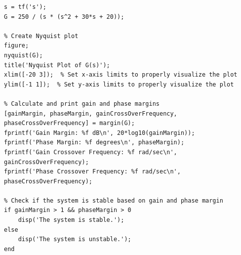 \documentclass[11pt]{article}
\begin{document}
\begin{lstlisting}[caption={MATLAB Code to Plot Nyquist of \( G(s) \)}]
% Define the transfer function
s = tf('s');
G = 250 / (s * (s^2 + 30*s + 20));

% Create Nyquist plot
figure;
nyquist(G);
title('Nyquist Plot of G(s)');
xlim([-20 3]);  % Set x-axis limits to properly visualize the plot
ylim([-1 1]);  % Set y-axis limits to properly visualize the plot

% Calculate and print gain and phase margins
[gainMargin, phaseMargin, gainCrossOverFrequency, phaseCrossOverFrequency] = margin(G);
fprintf('Gain Margin: %f dB\n', 20*log10(gainMargin));
fprintf('Phase Margin: %f degrees\n', phaseMargin);
fprintf('Gain Crossover Frequency: %f rad/sec\n', gainCrossOverFrequency);
fprintf('Phase Crossover Frequency: %f rad/sec\n', phaseCrossOverFrequency);

% Check if the system is stable based on gain and phase margin
if gainMargin > 1 && phaseMargin > 0
    disp('The system is stable.');
else
    disp('The system is unstable.');
end

\end{lstlisting}
\end{document}
